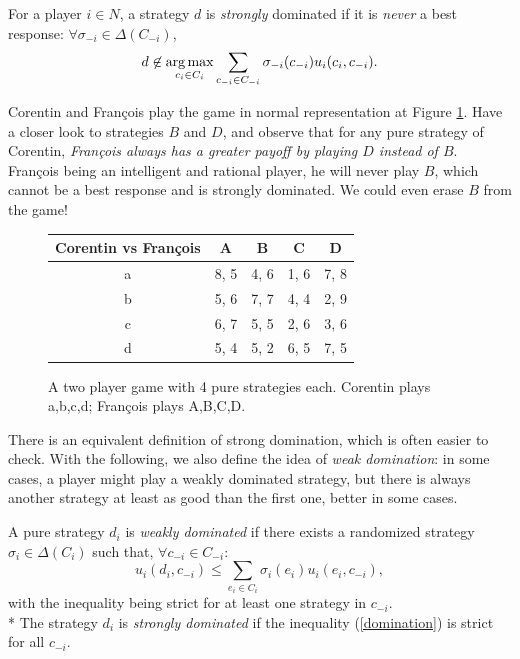  \begin{definition}
 For a player $i \in N$, a strategy $d$ is \emph{strongly} dominated if it is \emph{never} a best response: $\forall \sigma_{-i} \in \Delta(C_{-i})$,
 $$ d \not \in \operatorname*{arg\,max}_{c_i \in C_i} \sum_{c_{-i} \in C_{-i}} \sigma_{-i}(c_{-i}) u_i(c_i, c_{-i}).$$
 \label{chap2:defdomibr}
 \end{definition}

\begin{example}
\label{chap2:exampleintrodomi}
Corentin and Fran\c{c}ois play the game in normal representation at Figure \ref{chap2:videogame}.
Have a closer look to strategies $B$ and $D$, and observe that for any pure strategy of Corentin, \emph{Fran\c{c}ois always has a greater payoff by playing $D$ instead of $B$}.
Fran\c{c}ois being an intelligent and rational player, he will never play $B$, which cannot be a best response and is strongly dominated.
We could even erase $B$ from the game!
 \begin{figure}[!h]
\centering
\begin{tabular}{c|cccc}
  Corentin vs Fran\c{c}ois &  A &  B & C & D\\
\hline a & 8, 5 &  4, 6 & 1, 6 & 7, 8 \\
 b & 5, 6 &  7, 7 & 4, 4 & 2, 9 \\
 c & 6, 7 &  5, 5 & 2, 6 & 3, 6 \\
 d & 5, 4 &  5, 2 & 6, 5 & 7, 5 \\
\end{tabular}
\caption{A two player game with 4 pure strategies each. Corentin plays a,b,c,d; Fran\c{c}ois plays A,B,C,D.}
\label{chap2:videogame}
\end{figure}

\end{example}

There is an equivalent definition of strong domination, which is often easier to check. With the following, we also define the idea of \emph{weak domination}: in some cases, a player might play a weakly dominated strategy, but there is always another strategy at least as good than the first one, better in some cases.

\begin{definition}
A pure strategy $d_i$ is \emph{weakly dominated} if there exists a randomized strategy $\sigma_i \in \Delta(C_i)$ such that, $\forall c_{-i} \in C_{-i}$:
\begin{equation}
 u_i(d_i, c_{-i}) \leq \sum_{e_i \in C_i} \sigma_i(e_i) u_i(e_i, c_{-i}),
 \label{domination}
\end{equation}
with the inequality being strict for at least one strategy in $c_{-i}$.\\*
The strategy $d_i$ is \emph{strongly dominated} if the inequality (\ref{domination}) is strict for all $c_{-i}$.
\label{defdomipayoffs}
 \end{definition}


